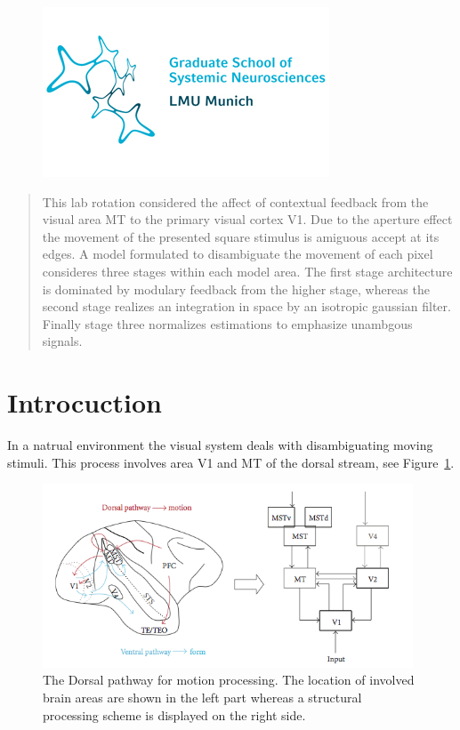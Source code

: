 \documentclass[a4paper]{article}
\begin{document}
\begin{titlepage}
\begin{center}
\vspace{0.1cm}
\begin{figure}[ht]
\centering
\includegraphics[scale=0.40]{GSN}
\end{figure}
\vspace{1cm}
\end{center}

\begin{abstract}

This lab rotation considered the affect of contextual feedback from the visual area MT to the primary visual cortex V1. Due to the aperture effect the movement of the presented square stimulus is amiguous accept at its edges. A model formulated to disambiguate the movement of each pixel consideres three stages within each model area. The first stage architecture is dominated by modulary feedback from the higher stage, whereas the second stage realizes an integration in space by an isotropic gaussian filter. Finally stage three normalizes estimations to emphasize unambgous signals.
\end{abstract}

\end{titlepage}

\newpage
\tableofcontents

\newpage
\section{Introcuction}
In a natrual environment the visual system deals with disambiguating moving stimuli. This process involves area V1 and MT of the dorsal stream, see Figure~\ref{fig:bouecke1}.\\

\vspace{0.5cm}
\begin{figure}[ht]
\centering
\includegraphics[width=11cm]{bouecke1}
\caption{The Dorsal pathway for motion processing. The location of involved brain areas are shown in the left part whereas a structural processing scheme is displayed on the right side.}
\label{fig:bouecke1}
\end{figure}
\vspace{0.5cm}
\end{document}
